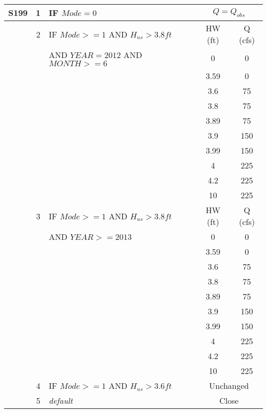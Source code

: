 \begin{table}[!h]
\begin{tabular}{|l|c|l|c|c|}
S199          &  1  & IF $Mode=0$                            & \multicolumn{2}{|c|}{$Q = Q_{obs}$}   \\
\hline
              &  2  & IF $Mode>=1$ AND $H_{us}>3.8ft$        & HW (ft) & Q (cfs)  \\
              &     & AND $YEAR = 2012$ AND $MONTH >=6$      & 0	&  0      \\
              &     &                                        & 3.59	&  0      \\
              &     &                                        & 3.6	&  75   \\
              &     &                                        & 3.8	&  75   \\
              &     &                                        & 3.89	&  75   \\
              &     &                                        & 3.9	&  150  \\
              &     &                                        & 3.99	&  150  \\
              &     &                                        & 4	&  225  \\
              &     &                                        & 4.2	&  225  \\
              &     &                                        & 10	&  225  \\
\hline
              &  3  & IF $Mode>=1$ AND $H_{us}>3.8ft$        & HW (ft) & Q (cfs)  \\
              &     & AND $YEAR >= 2013$                     & 0	&  0      \\
              &     &                                        & 3.59	&  0      \\
              &     &                                        & 3.6	&  75   \\
              &     &                                        & 3.8	&  75   \\
              &     &                                        & 3.89	&  75   \\
              &     &                                        & 3.9	&  150  \\
              &     &                                        & 3.99	&  150  \\
              &     &                                        & 4	&  225  \\
              &     &                                        & 4.2	&  225  \\
              &     &                                        & 10	&  225  \\
\hline
              &  4  & IF $Mode>=1$ AND $H_{us}>3.6ft$        & \multicolumn{2}{|c|}{Unchanged}   \\
\hline
              &  5  & \it{default}                           & \multicolumn{2}{|c|}{Close}           \\
\hline
\hline
\end{tabular}
\end{table}
\normalsize

